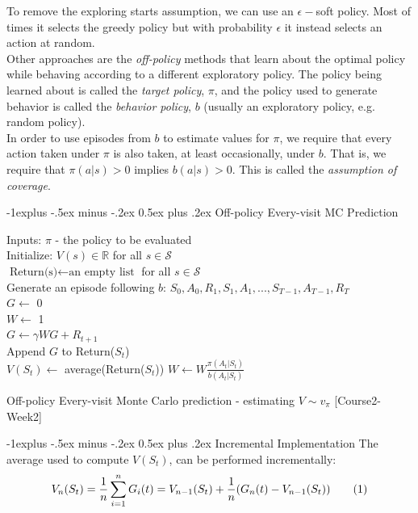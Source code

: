 \documentclass[10pt,landscape]{article}
\makeatletter
\renewcommand{\subsection}{\@startsection{subsection}{2}{0mm}%
                                {-1explus -.5ex minus -.2ex}%
                                {0.5ex plus .2ex}%
                                {\normalfont\normalsize\bfseries}}
\newcommand\numberthis{\addtocounter{equation}{1}\tag{\theequation}}
\makeatother
\begin{document}
\begin{multicols}{3}
To remove the exploring starts assumption, we can use an $\epsilon-$soft policy. Most of times it selects the greedy policy but with probability $\epsilon$ it instead selects an action at random.\\
Other approaches are the \emph{off-policy} methods that learn about the optimal policy while behaving according to a different exploratory policy.
The policy being learned about is called the \emph{target policy}, $\pi$, and the policy used to generate behavior is called the \emph{behavior policy}, $b$ (usually an exploratory policy, e.g. random policy).\\
In order to use episodes from $b$ to estimate values for $\pi$, we require that every action taken under $\pi$ is also taken, at least occasionally, under $b$. That is, we require that $\pi(a|s) > 0$ implies $b(a|s) > 0$. This is called the \emph{assumption of coverage}.

\subsection{Off-policy Every-visit MC Prediction}
\begin{algorithm}[H]
Inputs: $\pi$ - the policy to be evaluated \\
Initialize: $V(s) \in \mathbb{R}$ for all $s \in \mathcal{S}$ \\
$\text{Return(s)} \leftarrow \text{an empty list}$ for all $s \in \mathcal{S}$ \\
{
    Generate an episode following $b$: $S_0, A_0, R_1, S_1, A_1,..., S_{T-1}, A_{T-1}, R_T$\\
    $G \leftarrow$ 0 \\
    $W \leftarrow$ 1 \\
    {
    	$G \leftarrow \gamma W G + R_{t+1}$\\
	Append $G$ to Return($S_t$)\\
	$V(S_t) \leftarrow$ average(Return($S_t$))
	$W \leftarrow W \frac{\pi(A_t|S_t)}{b(A_t|S_t)}$
    }
 }
\caption{Off-policy Every-visit Monte Carlo prediction - estimating $V \sim v_{\pi}$ [Course2-Week2]}
\end{algorithm}

\subsection{Incremental Implementation}
The average used to compute $V(S_t)$, can be performed incrementally:
\begin{align*}
V_n(S_t) = \frac{1}{n} \sum_{i=1}^{n} G_i(t) = V_{n-1}(S_t) + \frac{1}{n} (G_n(t) - V_{n-1}(S_t)) \label{eq:incremental_mc}\numberthis
\end{align*}


\end{multicols}
\end{document}
